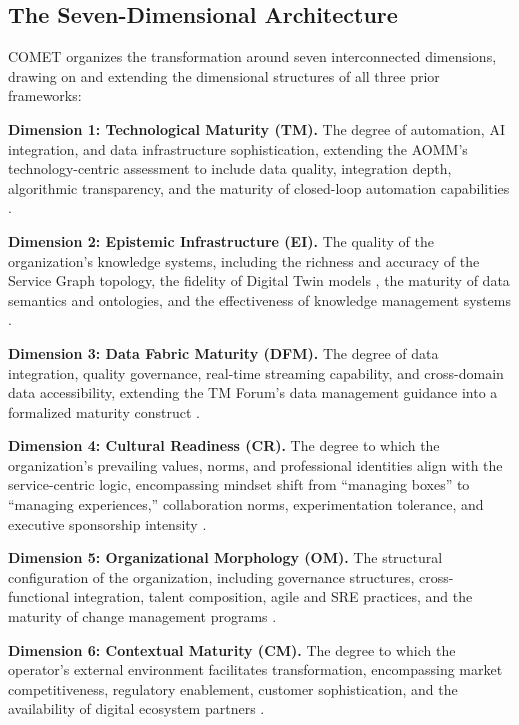 \documentclass[12pt,a4paper]{article}
\begin{document}
\subsection{The Seven-Dimensional Architecture}

COMET organizes the transformation around seven interconnected dimensions, drawing on and extending the dimensional structures of all three prior frameworks:

\textbf{Dimension 1: Technological Maturity (TM).} The degree of automation, AI integration, and data infrastructure sophistication, extending the AOMM's \citep{tmforum2024b,tmforum2026aomm} technology-centric assessment to include data quality, integration depth, algorithmic transparency, and the maturity of closed-loop automation capabilities \citep{chen2024ai,zhang2022ml}.

\textbf{Dimension 2: Epistemic Infrastructure (EI).} The quality of the organization's knowledge systems, including the richness and accuracy of the Service Graph topology, the fidelity of Digital Twin models \citep{li2023digital,shu2025digital}, the maturity of data semantics and ontologies, and the effectiveness of knowledge management systems \citep{dehghani2022data}.

\textbf{Dimension 3: Data Fabric Maturity (DFM).} The degree of data integration, quality governance, real-time streaming capability, and cross-domain data accessibility, extending the TM Forum's data management guidance into a formalized maturity construct \citep{tmforum2024a}.

\textbf{Dimension 4: Cultural Readiness (CR).} The degree to which the organization's prevailing values, norms, and professional identities align with the service-centric logic, encompassing mindset shift from ``managing boxes'' to ``managing experiences,'' collaboration norms, experimentation tolerance, and executive sponsorship intensity \citep{cameron2006diagnosing,pratt2006constructing}.

\textbf{Dimension 5: Organizational Morphology (OM).} The structural configuration of the organization, including governance structures, cross-functional integration, talent composition, agile and SRE practices, and the maturity of change management programs \citep{lewin1947frontiers,weick1999organizational}.

\textbf{Dimension 6: Contextual Maturity (CM).} The degree to which the operator's external environment facilitates transformation, encompassing market competitiveness, regulatory enablement, customer sophistication, and the availability of digital ecosystem partners \citep{tornatzky1990processes,protogerou2012dynamic}.
\end{document}
